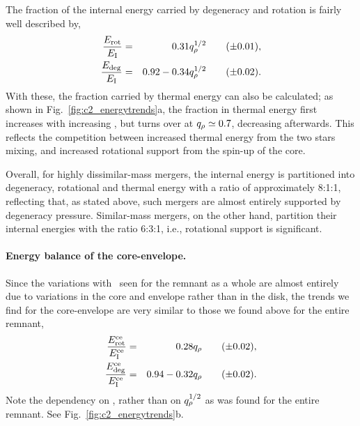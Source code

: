 The fraction of the internal energy carried by degeneracy and rotation is fairly well described by,
\begin{eqnarray}
\frac{E_\mathrm{rot}}{E_\mathrm{I}} &=& 0.31\qrho^{1/2}
\qquad(\pm0.01),\\
\frac{E_\mathrm{deg}}{E_\mathrm{I}} &=& 0.92 - 0.34\qrho^{1/2}
\qquad(\pm0.02).
\end{eqnarray}
With these, the fraction carried by thermal energy can also be calculated; as shown in Fig.~\ref{fig:c2_energytrends}a, the fraction in thermal energy first increases with increasing \qrho, but turns over at $\qrho\simeq0.7$, decreasing afterwards.  This reflects the competition between increased thermal energy from the two stars mixing, and increased rotational support from the spin-up of the core.  

Overall, for highly dissimilar-mass mergers, the internal energy is partitioned into degeneracy, rotational and thermal energy with a ratio of approximately 8:1:1, reflecting that, as stated above, such mergers are almost entirely supported by degeneracy pressure.  Similar-mass mergers, on the other hand, partition their internal energies with the ratio 6:3:1, i.e., rotational support is significant.  

\paragraph{Energy balance of the core-envelope.} Since the variations with \qrho\ seen for the remnant as a whole are almost entirely due to variations in the core and envelope rather than in the disk, the trends we find for the core-envelope are very similar to those we found above for the entire remnant,
\begin{eqnarray}
\frac{E^\mrm{ce}_\mathrm{rot}}{E^\mrm{ce}_\mathrm{I}} &=& 0.28\qrho
\qquad(\pm0.02), \\
\frac{E^\mrm{ce}_\mathrm{deg}}{E^\mrm{ce}_\mathrm{I}} &=& 0.94 - 0.32\qrho
\qquad(\pm0.02).
\end{eqnarray}
Note the dependency on \qrho, rather than on $\qrho^{1/2}$ as was found for the entire remnant.  See Fig.~\ref{fig:c2_energytrends}b.

